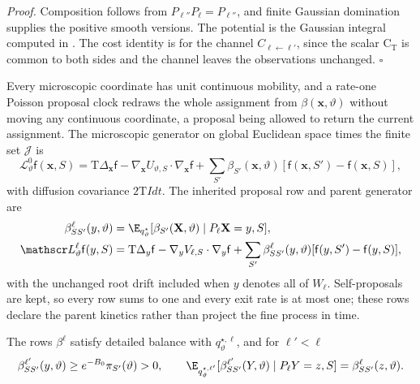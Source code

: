 \noindent\emph{Proof.}
Composition follows from \(P_{\ell''}P_\ell=P_{\ell''}\), and finite Gaussian
domination supplies the positive smooth versions. The potential is the
Gaussian integral computed in . The cost
identity is  for the channel
\(C_{\ell\leftarrow\ell'}\), since the scalar \(\mathrm C_{\mathrm T}\) is
common to both sides and the channel leaves the observations unchanged.
\(\square\)

Every microscopic coordinate has unit continuous mobility, and a rate-one
Poisson proposal clock redraws the whole assignment from
\(\beta(\mathbf x,\vartheta)\) without moving any continuous coordinate, a
proposal being allowed to return the current assignment. The microscopic
generator on global Euclidean space times the finite set \(\mathcal J\) is
\begin{equation}
\mathscr L_\vartheta^0\mathsf f(\mathbf x,S)
=\mathrm T\Delta_{\mathbf x}\mathsf f-\nabla_{\mathbf x}U_{\vartheta,S}\cdot\nabla_{\mathbf x}\mathsf f
 +\sum_{S'}\beta_{S'}(\mathbf x,\vartheta)[\mathsf f(\mathbf x,S')-\mathsf f(\mathbf x,S)],
\label{eq:rg-formation-microscopic-generator}
\end{equation}
with diffusion covariance \(2\mathrm TI dt\). The inherited proposal row and
parent generator are
\begin{equation}
\begin{aligned}
\beta^\ell_{SS'}(y,\vartheta)
 &=\E_{q^\star_\vartheta}
     [\beta_{S'}(\mathbf X,\vartheta)\mid P_\ell\mathbf X=y,S],\\
\mathscr L_\vartheta^\ell\mathsf f(y,S)
 &=\mathrm T\Delta_y\mathsf f-\nabla_yV_{\ell,S}\cdot\nabla_y\mathsf f
   +\sum_{S'}\beta^\ell_{SS'}(y,\vartheta)[\mathsf f(y,S')-\mathsf f(y,S)],
\end{aligned}
\label{eq:rg-formation-parent-generator}
\end{equation}
with the unchanged root drift included when \(y\) denotes all of \(W_\ell\).
Self-proposals are kept, so every row sums to one and every exit rate is at
most one; these rows declare the parent kinetics rather than project the fine
process in time.

The rows \(\beta^\ell\) satisfy detailed balance with \(q^{\star,\ell}_\vartheta\),
and for \(\ell'<\ell\)
\begin{equation}
\beta^{\ell'}_{SS'}(y,\vartheta)\ge e^{-B_0}\pi_{S'}(\vartheta)>0,
\qquad
\E_{q^{\star,\ell'}_\vartheta}
 [\beta^{\ell'}_{SS'}(Y,\vartheta)\mid P_\ell Y=z,S]
 =\beta^\ell_{SS'}(z,\vartheta).
\label{eq:rg-formation-rate-composition}
\end{equation}

